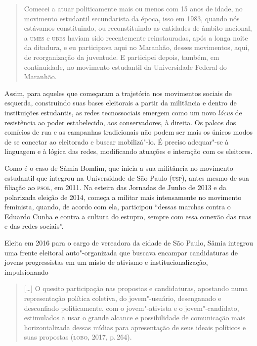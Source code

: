 \begin{quote}
Comecei a atuar politicamente mais ou menos com 15 anos de idade, no
movimento estudantil secundarista da época, isso em 1983, quando nós
estávamos constituindo, ou reconstituindo as entidades de âmbito
nacional, a \textsc{umes} e \textsc{ubes} haviam sido recentemente reinstauradas, após a
longa noite da ditadura, e eu participava aqui no Maranhão, desses
movimentos, aqui, de reorganização da juventude. E participei depois,
também, em continuidade, no movimento estudantil da Universidade Federal
do Maranhão.
\end{quote}

Assim, para aqueles que começaram a trajetória nos movimentos sociais de
esquerda, construindo suas bases eleitorais a partir da militância e
dentro de instituições estudantis, as redes tecnossociais emergem como
um novo \textit{lócus} de resistência ao poder estabelecido, aos
conservadores, à direita. Os palcos dos comícios de rua e as campanhas
tradicionais não podem ser mais os únicos modos de se conectar ao
eleitorado e buscar mobilizá"-lo. É preciso adequar"-se à linguagem e à
lógica das redes, modificando atuações e interação com os eleitores.

Como é o caso de Sâmia Bomfim, que inicia a sua militância no movimento
estudantil que integrou na Universidade de São Paulo (\textsc{usp}), antes mesmo
de sua filiação ao \textsc{psol}, em 2011. Na esteira das Jornadas de Junho de
2013 e da polarizada eleição de 2014, começa a militar mais intensamente
no movimento feminista, quando, de acordo com ela, participou ``dessas
marchas contra o Eduardo Cunha e contra a cultura do estupro, sempre com
essa conexão das ruas e das redes sociais''.

Eleita em 2016 para o cargo de vereadora da cidade de São Paulo, Sâmia
integrou uma frente eleitoral auto"-organizada que buscava encampar
candidaturas de jovens progressistas em um misto de ativismo e
institucionalização, impulsionando

\begin{quote}
{[}\ldots{}{]} O quesito participação nas propostas e candidaturas, apostando
numa representação política coletiva, do jovem"-usuário, desenganado e
desconfiado politicamente, com o jovem"-ativista e o jovem"-candidato,
estimulados a usar o grande alcance e possibilidade de comunicação mais
horizontalizada dessas mídias para apresentação de seus ideais políticos
e suas propostas (\textsc{lobo}, 2017, p.\,264).
\end{quote}


